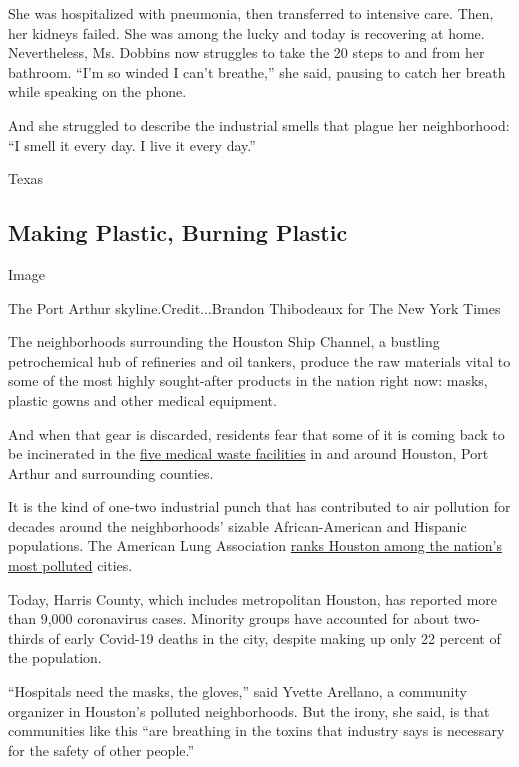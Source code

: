 She was hospitalized with pneumonia, then transferred to intensive care.
Then, her kidneys failed. She was among the lucky and today is
recovering at home. Nevertheless, Ms. Dobbins now struggles to take the
20 steps to and from her bathroom. ``I'm so winded I can't breathe,''
she said, pausing to catch her breath while speaking on the phone.

And she struggled to describe the industrial smells that plague her
neighborhood: ``I smell it every day. I live it every day.''

Texas

\hypertarget{making-plastic-burning-plastic}{%
\subsection{Making Plastic, Burning
Plastic}\label{making-plastic-burning-plastic}}

Image

The Port Arthur skyline.Credit...Brandon Thibodeaux for The New York
Times

The neighborhoods surrounding the Houston Ship Channel, a bustling
petrochemical hub of refineries and oil tankers, produce the raw
materials vital to some of the most highly sought-after products in the
nation right now: masks, plastic gowns and other medical equipment.

And when that gear is discarded, residents fear that some of it is
coming back to be incinerated in the
\href{https://www.tceq.texas.gov/assets/public/permitting/waste/msw/medical-waste-facilities-active.pdf}{five
medical waste facilities} in and around Houston, Port Arthur and
surrounding counties.

It is the kind of one-two industrial punch that has contributed to air
pollution for decades around the neighborhoods' sizable African-American
and Hispanic populations. The American Lung Association
\href{http://www.stateoftheair.org/city-rankings/msas/houston-the-woodlands-tx.html\#ozone}{ranks
Houston among the nation's most polluted} cities.

Today, Harris County, which includes metropolitan Houston, has reported
more than 9,000 coronavirus cases. Minority groups have accounted for
about two-thirds of early Covid-19 deaths in the city, despite making up
only 22 percent of the population.

``Hospitals need the masks, the gloves,'' said Yvette Arellano, a
community organizer in Houston's polluted neighborhoods. But the irony,
she said, is that communities like this ``are breathing in the toxins
that industry says is necessary for the safety of other people.''

